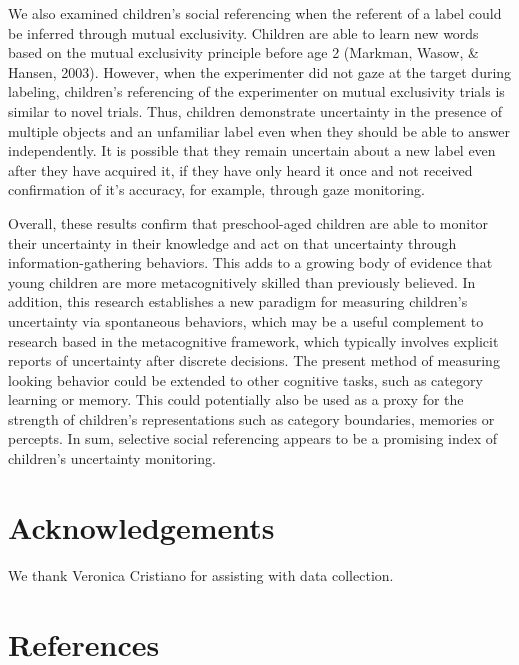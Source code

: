 \documentclass[10pt, letterpaper]{article}
\begin{document}
We also examined children's social referencing when the referent of a
label could be inferred through mutual exclusivity. Children are able to
learn new words based on the mutual exclusivity principle before age 2
(Markman, Wasow, \& Hansen, 2003). However, when the experimenter did
not gaze at the target during labeling, children's referencing of the
experimenter on mutual exclusivity trials is similar to novel trials.
Thus, children demonstrate uncertainty in the presence of multiple
objects and an unfamiliar label even when they should be able to answer
independently. It is possible that they remain uncertain about a new
label even after they have acquired it, if they have only heard it once
and not received confirmation of it's accuracy, for example, through
gaze monitoring.

Overall, these results confirm that preschool-aged children are able to
monitor their uncertainty in their knowledge and act on that uncertainty
through information-gathering behaviors. This adds to a growing body of
evidence that young children are more metacognitively skilled than
previously believed. In addition, this research establishes a new
paradigm for measuring children's uncertainty via spontaneous behaviors,
which may be a useful complement to research based in the metacognitive
framework, which typically involves explicit reports of uncertainty
after discrete decisions. The present method of measuring looking
behavior could be extended to other cognitive tasks, such as category
learning or memory. This could potentially also be used as a proxy for
the strength of children's representations such as category boundaries,
memories or percepts. In sum, selective social referencing appears to be
a promising index of children's uncertainty monitoring.

\section{Acknowledgements}\label{acknowledgements}

We thank Veronica Cristiano for assisting with data collection.

\section{References}\label{references}

\setlength{\parindent}{-0.1in} \setlength{\leftskip}{0.125in} \noindent
\end{document}
